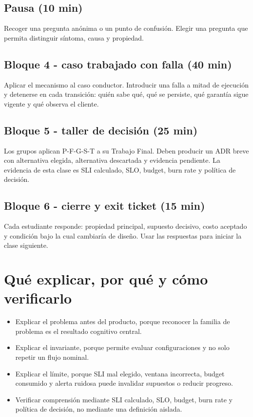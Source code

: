 \documentclass[variant=docente,cover=institutional,mode=screen]{ua-engineering-v6-article}
\begin{document}
\subsection*{Pausa (10 min)}
Recoger una pregunta anónima o un punto de confusión. Elegir una pregunta que permita distinguir síntoma, causa y propiedad.

\subsection*{Bloque 4 - caso trabajado con falla (40 min)}
Aplicar el mecanismo al caso conductor. Introducir una falla a mitad de ejecución y detenerse en cada transición: quién sabe qué, qué se persiste, qué garantía sigue vigente y qué observa el cliente.

\subsection*{Bloque 5 - taller de decisión (25 min)}
Los grupos aplican P-F-G-S-T a su Trabajo Final. Deben producir un ADR breve con alternativa elegida, alternativa descartada y evidencia pendiente. La evidencia de esta clase es SLI calculado, SLO, budget, burn rate y política de decisión.

\subsection*{Bloque 6 - cierre y exit ticket (15 min)}
Cada estudiante responde: propiedad principal, supuesto decisivo, costo aceptado y condición bajo la cual cambiaría de diseño. Usar las respuestas para iniciar la clase siguiente.

\section{Qué explicar, por qué y cómo verificarlo}
\begin{itemize}
\item Explicar el problema antes del producto, porque reconocer la familia de problema es el resultado cognitivo central.
\item Explicar el invariante, porque permite evaluar configuraciones y no solo repetir un flujo nominal.
\item Explicar el límite, porque SLI mal elegido, ventana incorrecta, budget consumido y alerta ruidosa puede invalidar supuestos o reducir progreso.
\item Verificar comprensión mediante SLI calculado, SLO, budget, burn rate y política de decisión, no mediante una definición aislada.
\end{itemize}
\end{document}

